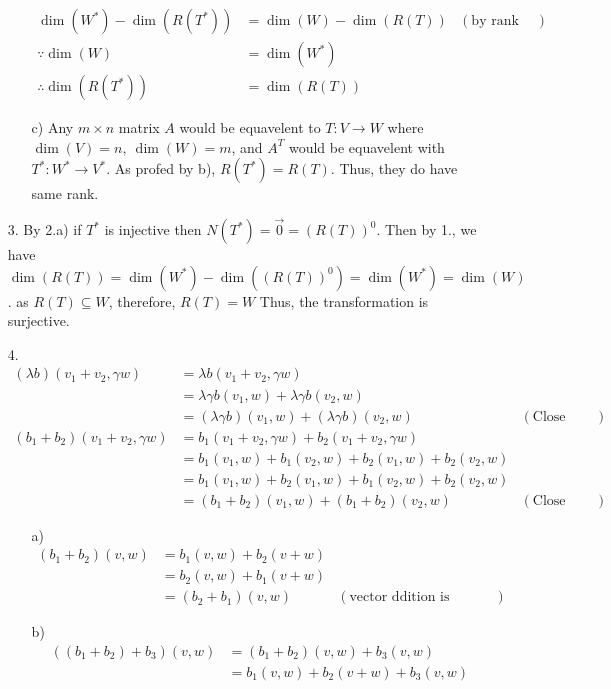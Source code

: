 \documentclass{article}
\begin{document}
\begin{itemize}
\begin{itemize}
\begin{align*}
            \dim(W^*)-\dim(R(T^*))&=\dim(W)-\dim(R(T))&(\text{by rank nullity})\\
            \because \dim(W)&=\dim(W^*)\\
            \therefore \dim(R(T^*))&=\dim(R(T))
        \end{align*}
        \item [c)]
        Any \(m\times n\) matrix \(A\) would be equavelent to \(T:V\rightarrow W\) where \(\dim(V)=n,\ \dim(W)=m\), and \(A^T\) would be equavelent with \(T^*:W^*\rightarrow V^*\). As profed by b), \(R(T^*)=R(T)\). Thus, they do have same rank.
    \end{itemize}
    \item [3.] By 2.a) if \(T^*\) is injective then \(N(T^*)={\overrightarrow{0}}=(R(T))^0\). Then by 1., we have \(\dim(R(T))=\dim(W^*)-\dim((R(T))^0)=\dim(W^*)=\dim(W)\). as \(R(T)\subseteq W\), therefore, \(R(T)=W\) Thus, the transformation is surjective.
    \item [4.] \begin{align*}
        (\lambda b)(v_1+v_2,\gamma w)&= \lambda b(v_1+v_2,\gamma w)\\
        &=\lambda\gamma b(v_1,w)+\lambda\gamma b(v_2,w)\\
        &=(\lambda\gamma b)(v_1,w)+(\lambda \gamma b)(v_2,w)&(\text{Close under scaler multi.})\\
    (b_1+b_2)(v_1+v_2,\gamma w)&=b_1(v_1+v_2,\gamma w)+b_2(v_1+v_2,\gamma w)\\
    &=b_1(v_1,w)+b_1(v_2,w)+b_2(v_1,w)+b_2(v_2,w)\\
    &=b_1(v_1,w)+b_2(v_1,w)+b_1(v_2,w)+b_2(v_2,w)\\
    &=(b_1+b_2)(v_1,w)+(b_1+b_2)(v_2,w)&(\text{Close under vector add})
    \end{align*}
    \begin{itemize}
        \item [a)] 
        \begin{align*}
            (b_1+b_2)(v,w)&=b_1(v,w)+b_2(v+w)\\
            &=b_2(v,w)+b_1(v+w)\\
            &=(b_2+b_1)(v,w)&(\text{vector ddition is communitive})
        \end{align*}
        \item [b)]
        \begin{align*}
            ((b_1+b_2)+b_3)(v,w)&=(b_1+b_2)(v,w)+b_3(v,w)\\
            &=b_1(v,w)+b_2(v+w)+b_3(v,w)\\

\end{align*}
\end{itemize}
\end{itemize}
\end{document}
